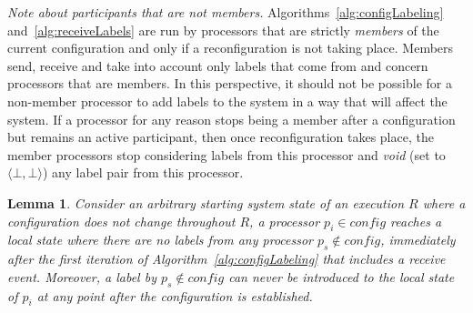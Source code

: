 \documentclass[11pt]{article}
\newtheorem{lemma}[theorem]{Lemma}
\begin{document}
{\em Note about participants that are not members.} Algorithms~\ref{alg:configLabeling} and~\ref{alg:receiveLabels} are run by processors that are strictly \emph{members} of the current configuration and only if a reconfiguration is not taking place.
Members send, receive and take into account only labels that come from and concern processors that are members.
In this perspective, it should not be possible for a non-member processor to add labels to the system in a way that will affect the system.
If a processor for any reason stops being a member after a configuration but remains an active participant, then once reconfiguration takes place, the member processors stop considering labels from this processor and \textit{void} (set to $\langle \bot, \bot \rangle$) any label pair from this processor. 







\begin{lemma}
\label{thL:staleInfo}
Consider an arbitrary starting system state of an execution $R$ where a configuration does not change throughout $R$, a processor $p_i \in config$ reaches a local state where there are no labels from any processor $p_s \not \in config$, immediately after the first iteration of Algorithm~\ref{alg:configLabeling} that includes a receive event. 
Moreover, a label by $p_s \not \in config$ can never be introduced to the local state of $p_i$ at any point after the configuration is established.
\end{lemma}
\end{document}
